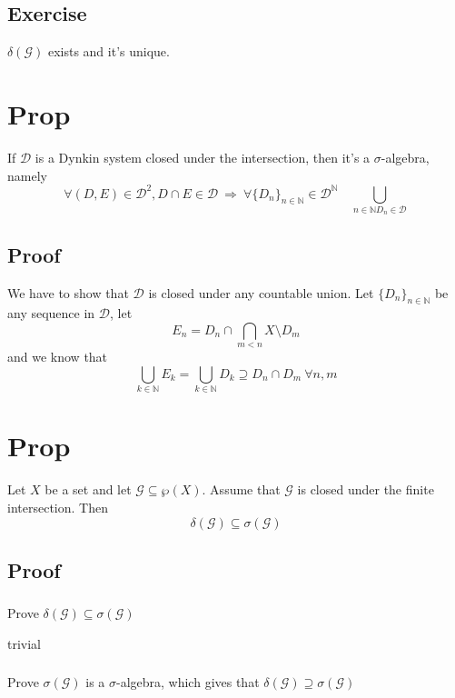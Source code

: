 \documentclass{book}
\begin{document}
\subsection*{Exercise}$\delta(\mathcal{G})$ exists and it's unique.
\section{Prop}
If $\mathscr{D}$ is a Dynkin system closed under the intersection, then it's a $\sigma$-algebra, namely
$$\forall(D,E)\in \mathscr{D}^2, D\cap E\in \mathscr{D}\ \Rightarrow\ \forall\{D_n\}_{n\in \mathbb{N}}\in \mathscr{D}^\mathbb{N}\quad \bigcup\limits_{n\in \mathbb{N}D_n\in \mathscr{D}}$$
\subsection*{Proof}
We have to show that $\mathscr{D}$ is closed under any countable union. Let $\{D_n\}_{n\in \mathbb{N}}$ be any sequence in $\mathscr{D}$, let
$$E_n=D_n\cap\bigcap\limits_{m<n}X\setminus D_m$$
and we know that 
$$\bigcup\limits_{k\in \mathbb{N}}E_k=\bigcup\limits_{k\in \mathbb{N}}D_k\supseteq D_n\cap D_m\ \forall n,m$$
\section{Prop}
\label{Prop 53.7}
Let $X$ be a set and let $\mathcal{G}\subseteq\wp(X)$. Assume that $\mathcal{G}$ is closed under the finite intersection. Then $$\delta(\mathcal{G})\subseteq\sigma(\mathcal{G})$$
\subsection*{Proof}
\subsubsection{}
Prove $\delta(\mathcal{G})\subseteq\sigma(\mathcal{G})$

trivial
\subsubsection{}
Prove $\sigma(\mathcal{G})$ is a $\sigma$-algebra, which gives that $\delta(\mathcal{G})\supseteq\sigma(\mathcal{G})$
\end{document}
